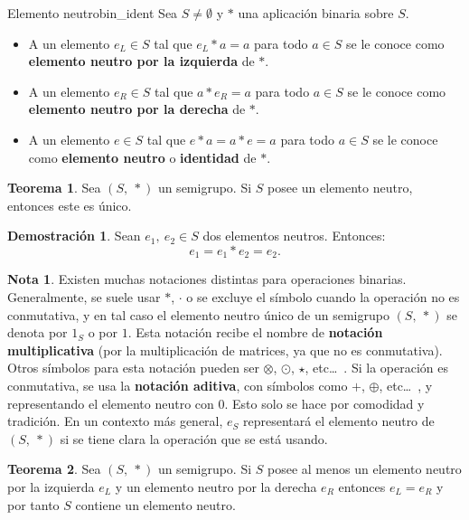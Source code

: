 \documentclass[a4paper]{book}
\theoremstyle{definition}
\newtheorem{theorem}{Teorema}[section]
\theoremstyle{ejemplo}
\newtheorem{nota}{Nota}[section]
\theoremstyle{demostracion}
\newtheorem{dem}{Demostración}
\begin{document}
\begin{define}{Elemento neutro}{bin_ident}
	Sea $S \neq \emptyset$ y $*$ una aplicación binaria sobre $S$.
	\begin{itemize}
		\item
		A un elemento $e_L \in S$ tal que $e_L * a = a$ para todo $a \in S$ se le conoce como \textbf{elemento neutro por la izquierda} de $*$.
		\item
		A un elemento $e_R \in S$ tal que $a * e_R = a$ para todo $a \in S$ se le conoce como \textbf{elemento neutro por la derecha} de $*$.
		\item
		A un elemento $e \in S$ tal que $e * a = a * e = a$ para todo $a \in S$ se le conoce como \textbf{elemento neutro} o \textbf{identidad} de $*$.
	\end{itemize}
\end{define}

\begin{theorem}
	Sea $(S,\ *)$ un semigrupo. Si $S$ posee un elemento neutro, entonces este es único.
\end{theorem}

\begin{dem}
	Sean $e_1,\ e_2 \in S$ dos elementos neutros. Entonces:
	\begin{equation*}
		e_1 = e_1 * e_2 = e_2.
	\end{equation*}
\end{dem}

\begin{nota}
	Existen muchas notaciones distintas para operaciones binarias. Generalmente, se suele usar $*$, $\cdot$ o se excluye el símbolo cuando la operación no es conmutativa, y en tal caso el elemento neutro único de un semigrupo $(S,\ *)$ se denota por $1_S$ o por $1$. Esta notación recibe el nombre de \textbf{notación multiplicativa} (por la multiplicación de matrices, ya que no es conmutativa). Otros símbolos para esta notación pueden ser $\otimes$, $\odot$, $\star$, etc\ldots\ . Si la operación es conmutativa, se usa la \textbf{notación aditiva}, con símbolos como $+$, $\oplus$, etc\ldots\ , y representando el elemento neutro con $0$.
	Esto solo se hace por comodidad y tradición. En un contexto más general, $e_S$ representará el elemento neutro de $(S,\ *)$ si se tiene clara la operación que se está usando.
\end{nota}

\begin{theorem}
	Sea $(S,\ *)$ un semigrupo. Si $S$ posee al menos un elemento neutro por la izquierda $e_L$ y un elemento neutro por la derecha $e_R$ entonces $e_L = e_R$ y por tanto $S$ contiene un elemento neutro.
\end{theorem}
\end{document}

